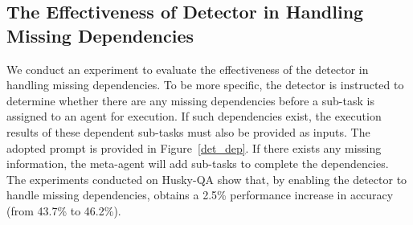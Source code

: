 \subsection{The Effectiveness of Detector in Handling Missing Dependencies}
\label{app:exp_detector}
We conduct an experiment to evaluate the effectiveness of the detector in handling missing dependencies. To be more specific, the detector is instructed to determine whether there are any missing dependencies before a sub-task is assigned to an agent for execution. If such dependencies exist, the execution results of these dependent sub-tasks must also be provided as inputs. The adopted prompt is provided in Figure~\ref{det_dep}. If there exists any missing information, the meta-agent will add sub-tasks to complete the dependencies.
The experiments conducted on Husky-QA show that, by enabling the detector to handle missing dependencies, \name obtains a 2.5\% performance increase in accuracy (from 43.7\% to 46.2\%). 

